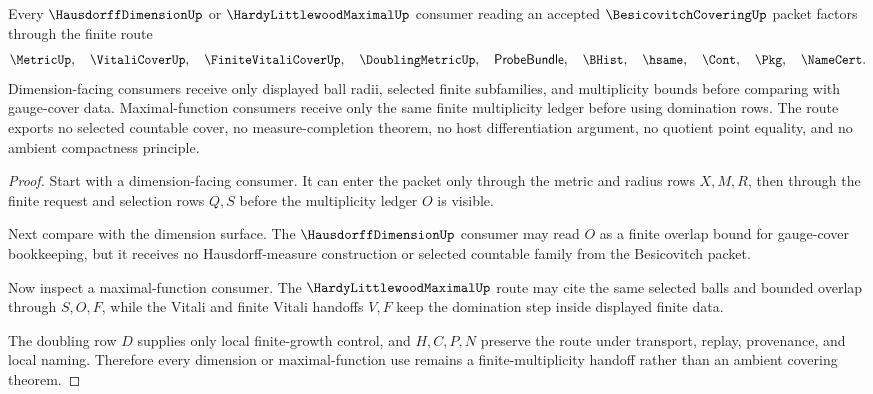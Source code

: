 \begin{theorem}
\label{thm:besicovitch-covering-finite-multiplicity-route}
Every $\HausdorffDimensionUp$ or $\HardyLittlewoodMaximalUp$ consumer reading an accepted $\BesicovitchCoveringUp$ packet factors through the finite route
$$
\MetricUp,\quad \VitaliCoverUp,\quad \FiniteVitaliCoverUp,\quad \DoublingMetricUp,\quad \mathsf{ProbeBundle},\quad \BHist,\quad \hsame,\quad \Cont,\quad \Pkg,\quad \NameCert .
$$
Dimension-facing consumers receive only displayed ball radii, selected finite subfamilies, and multiplicity bounds before comparing with gauge-cover data. Maximal-function consumers receive only the same finite multiplicity ledger before using domination rows. The route exports no selected countable cover, no measure-completion theorem, no host differentiation argument, no quotient point equality, and no ambient compactness principle.
\end{theorem}
\begin{proof}
Start with a dimension-facing consumer. It can enter the packet only through the metric and radius rows $X,M,R$, then through the finite request and selection rows $Q,S$ before the multiplicity ledger $O$ is visible.

Next compare with the dimension surface. The $\HausdorffDimensionUp$ consumer may read $O$ as a finite overlap bound for gauge-cover bookkeeping, but it receives no Hausdorff-measure construction or selected countable family from the Besicovitch packet.

Now inspect a maximal-function consumer. The $\HardyLittlewoodMaximalUp$ route may cite the same selected balls and bounded overlap through $S,O,F$, while the Vitali and finite Vitali handoffs $V,F$ keep the domination step inside displayed finite data.

The doubling row $D$ supplies only local finite-growth control, and $H,C,P,N$ preserve the route under transport, replay, provenance, and local naming. Therefore every dimension or maximal-function use remains a finite-multiplicity handoff rather than an ambient covering theorem.
\end{proof}


